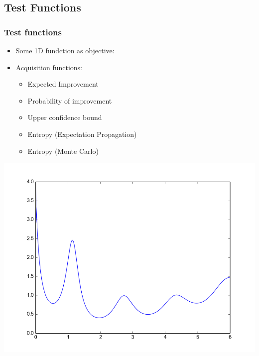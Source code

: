 \documentclass[10pt,handout]{beamer}
\begin{document}



\subsection{Test Functions}





\begin{frame}
\frametitle{Test functions}
\begin{minipage}{0.55\textwidth}
\begin{itemize}
\item Some 1D fundction as objective:
\item Acquisition functions:
\begin{itemize}
\item Expected Improvement
\item Probability of improvement
\item Upper confidence bound
\item Entropy (Expectation Propagation)
\item Entropy (Monte Carlo)
\end{itemize}
\end{itemize}  
\end{minipage}%
\begin{minipage}{0.43\textwidth}
\includegraphics[width=\textwidth]{self_constructed_oned.png}
\end{minipage}
\end{frame}
\end{document}
